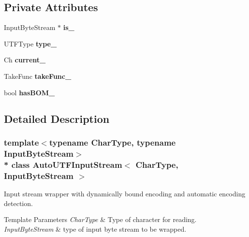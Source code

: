 \subsection*{Private Attributes}
\begin{DoxyCompactItemize}
\item 
Input\+Byte\+Stream $\ast$ {\bfseries is\+\_\+}\hypertarget{class_auto_u_t_f_input_stream_aee206b352000902d02dac147761a61dc}{}\label{class_auto_u_t_f_input_stream_aee206b352000902d02dac147761a61dc}

\item 
U\+T\+F\+Type {\bfseries type\+\_\+}\hypertarget{class_auto_u_t_f_input_stream_aef307895f82bc15a7a37ded277aefe2e}{}\label{class_auto_u_t_f_input_stream_aef307895f82bc15a7a37ded277aefe2e}

\item 
Ch {\bfseries current\+\_\+}\hypertarget{class_auto_u_t_f_input_stream_a1b89f7dca4c3c462347bf7bc066a2fe1}{}\label{class_auto_u_t_f_input_stream_a1b89f7dca4c3c462347bf7bc066a2fe1}

\item 
Take\+Func {\bfseries take\+Func\+\_\+}\hypertarget{class_auto_u_t_f_input_stream_a8996755d783dcae9049d9f1ad96391fb}{}\label{class_auto_u_t_f_input_stream_a8996755d783dcae9049d9f1ad96391fb}

\item 
bool {\bfseries has\+B\+O\+M\+\_\+}\hypertarget{class_auto_u_t_f_input_stream_ac329c186f5b0dc82433effecaaf1bf46}{}\label{class_auto_u_t_f_input_stream_ac329c186f5b0dc82433effecaaf1bf46}

\end{DoxyCompactItemize}


\subsection{Detailed Description}
\subsubsection*{template$<$typename Char\+Type, typename Input\+Byte\+Stream$>$\\*
class Auto\+U\+T\+F\+Input\+Stream$<$ Char\+Type, Input\+Byte\+Stream $>$}

Input stream wrapper with dynamically bound encoding and automatic encoding detection. 


\begin{DoxyTemplParams}{Template Parameters}
{\em Char\+Type} & Type of character for reading. \\
\hline
{\em Input\+Byte\+Stream} & type of input byte stream to be wrapped. \\
\hline
\end{DoxyTemplParams}


